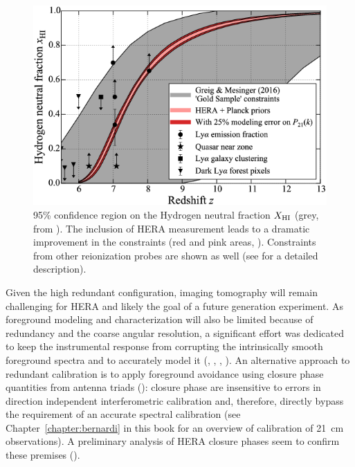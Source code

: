 \begin{figure}[]
\begin{center}
\includegraphics[width=1.\textwidth]{Koopmans_Bernardi/hera_ion_hist}
\end{center}
\caption{95\% confidence region on the Hydrogen neutral fraction $X_{\rm HI}$ (grey, from \cite{greig17}). The inclusion of HERA measurement leads to a dramatic improvement in the constraints (red and pink areas, \cite{liu16b}). Constraints from other reionization probes are shown as well (see \cite{deboer17} for a detailed description).}
\label{fig:fig_hera_ion_hist}
\end{figure}

Given the high redundant configuration, imaging tomography will remain challenging for HERA and likely the goal of a future generation experiment. As foreground modeling and characterization will also be limited because of redundancy and the coarse angular resolution, a significant effort was dedicated to keep the instrumental response from corrupting the intrinsically smooth foreground spectra and to accurately model it (\cite{neben16}, \cite{ewallwice16}, \cite{thyagarajan16}, \cite{patra18}). An alternative approach to redundant calibration is to apply foreground avoidance using closure phase quantities from antenna triads (\cite{thyagarajan18}): closure phase are insensitive to errors in direction independent interferometric calibration and, therefore, directly bypass the requirement of an accurate spectral calibration (see Chapter~\ref{chapter:bernardi} in this book for an overview of calibration of 21~cm observations). A preliminary analysis of HERA closure phases seem to confirm these premises (\cite{carilli18}).


